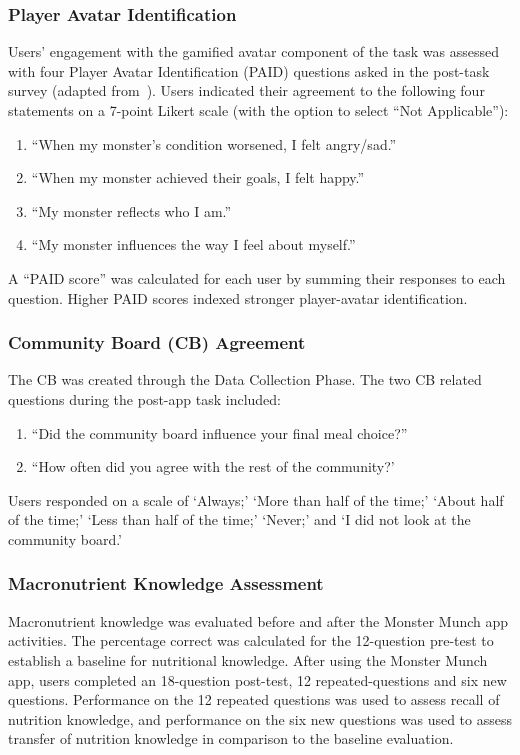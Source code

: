 \subsubsection{Player Avatar Identification}
Users' engagement with the gamified avatar component of the task was assessed with four Player Avatar Identification (PAID) questions asked in the post-task survey (adapted from~\cite{li2013player}). Users indicated their agreement to the following four statements on a 7-point Likert scale (with the option to select ``Not Applicable''): 
\begin{enumerate}
    \item ``When my monster’s condition worsened, I felt angry/sad.''
    \item ``When my monster achieved their goals, I felt happy.''
    \item ``My monster reflects who I am.''
    \item ``My monster influences the way I feel about myself.'' 
\end{enumerate}
A ``PAID score'' was calculated for each user by summing their responses to each question. Higher PAID scores indexed stronger player-avatar identification.

\subsubsection{Community Board (CB) Agreement}

The CB was created through the Data Collection Phase. The two CB related questions during the post-app task included: 
\begin{enumerate}
    \item ``Did the community board influence your final meal choice?'' 
    \item ``How often did you agree with the rest of the community?'
\end{enumerate}

Users responded on a scale of `Always;' `More than half of the time;' `About half of the time;' `Less than half of the time;' `Never;' and `I did not look at the community board.' 

\subsubsection{Macronutrient Knowledge Assessment}

Macronutrient knowledge was evaluated before and after the Monster Munch app activities. The percentage correct was calculated for the 12-question pre-test to establish a baseline for nutritional knowledge. After using the Monster Munch app, users completed an 18-question post-test, 12 repeated-questions and six new questions. Performance on the 12 repeated questions was used to assess recall of nutrition knowledge, and performance on the six new questions was used to assess transfer of nutrition knowledge in comparison to the baseline evaluation. 
\vspace{-5pt}
